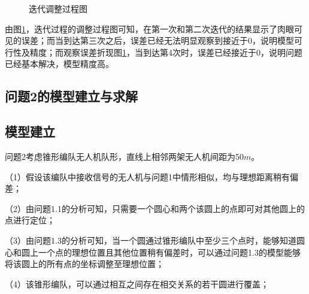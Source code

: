 \documentclass[12pt]{ctexart}
\begin{document}
\begin{spacing}{1.5}
\begin{figure}[H]
{\begin{minipage}{0.5\textwidth}
		\end{minipage}
	}
	\caption{迭代调整过程图}
	\label{tu11}
\end{figure}
由图\ref{tu11}，迭代过程的调整过程图可知，在第一次和第二次迭代的结果显示了肉眼可见的误差；而当到达第三次之后，误差已经无法明显观察到接近于0，说明模型可行性及精度；而观察误差折现图\ref{tu11}，当到达第4次时，误差已经接近于0，说明问题已经基本解决，模型精度高。

\subsection{问题2的模型建立与求解}
\subsection{模型建立}
问题2考虑锥形编队无人机队形，直线上相邻两架无人机间距为50$m$。

（1）假设该编队中接收信号的无人机与问题1中情形相似，均与理想距离稍有偏差；

（2）由问题1.1的分析可知，只需要一个圆心和两个该圆上的点即可对其他圆上的点进行定位；

（3）由问题1.3的分析可知，当一个圆通过锥形编队中至少三个点时，能够知道圆心和圆上一个点的理想位置且其他位置稍有偏差时，可以通过问题1.3的模型能够将该圆上的所有点的坐标调整至理想位置；

（4）该锥形编队，可以通过相互之间存在相交关系的若干圆进行覆盖；


\end{spacing}
\end{document}
